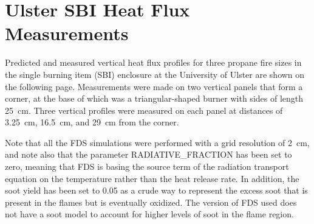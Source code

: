 %



\clearpage

\section{Ulster SBI Heat Flux Measurements}

Predicted and measured vertical heat flux profiles for three propane fire sizes in the
single burning item (SBI) enclosure at the University of Ulster are shown on the following page.
Measurements were made on two
vertical panels that form a corner, at the base of which was a triangular-shaped burner with sides of
length 25~cm. Three vertical profiles were measured on each panel at distances of 3.25~cm, 16.5~cm, and
29~cm from the corner.

Note that all the FDS simulations were performed with a grid resolution of 2~cm, and note also that
the parameter {\ct RADIATIVE\_FRACTION} has been set to zero, meaning that FDS is basing the source term
of the radiation transport equation on the temperature rather than the heat release rate. In addition, the
soot yield has been set to 0.05 as a crude way to represent the excess soot that is present in the flames but is
eventually oxidized. The version of FDS used does not have a soot model to
account for higher levels of soot in the flame region.

